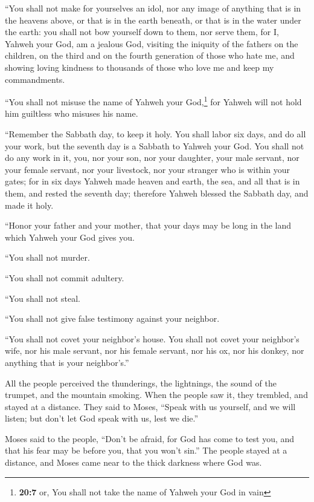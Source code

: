  ``You shall not make for yourselves an idol, nor any
image of anything that is in the heavens above, or that is in the earth
beneath, or that is in the water under the earth:  you
shall not bow yourself down to them, nor serve them, for I, Yahweh your
God, am a jealous God, visiting the iniquity of the fathers on the
children, on the third and on the fourth generation of those who hate
me,  and showing loving kindness to thousands of those who
love me and keep my commandments.

 ``You shall not misuse the name of Yahweh your
God,\footnote{\textbf{20:7} or, You shall not take the name of Yahweh
  your God in vain} for Yahweh will not hold him guiltless who misuses
his name.

 ``Remember the Sabbath day, to keep it holy.
 You shall labor six days, and do all your work,
 but the seventh day is a Sabbath to Yahweh your God. You
shall not do any work in it, you, nor your son, nor your daughter, your
male servant, nor your female servant, nor your livestock, nor your
stranger who is within your gates;  for in six days
Yahweh made heaven and earth, the sea, and all that is in them, and
rested the seventh day; therefore Yahweh blessed the Sabbath day, and
made it holy.

 ``Honor your father and your mother, that your days may
be long in the land which Yahweh your God gives you.

 ``You shall not murder.

 ``You shall not commit adultery.

 ``You shall not steal.

 ``You shall not give false testimony against your
neighbor.

 ``You shall not covet your neighbor's house. You shall
not covet your neighbor's wife, nor his male servant, nor his female
servant, nor his ox, nor his donkey, nor anything that is your
neighbor's.''

 All the people perceived the thunderings, the
lightnings, the sound of the trumpet, and the mountain smoking. When the
people saw it, they trembled, and stayed at a distance. 
They said to Moses, ``Speak with us yourself, and we will listen; but
don't let God speak with us, lest we die.''

 Moses said to the people, ``Don't be afraid, for God has
come to test you, and that his fear may be before you, that you won't
sin.''  The people stayed at a distance, and Moses came
near to the thick darkness where God was.

